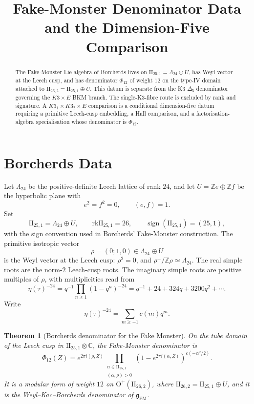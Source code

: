 \documentclass[11pt]{amsart}
\newtheorem{theorem}{Theorem}[section]
\theoremstyle{definition}
\theoremstyle{remark}
\providecommand{\C}{\mathbb{C}}
\providecommand{\Z}{\mathbb{Z}}
\providecommand{\Leech}{\Lambda_{24}}
\providecommand{\IIlor}{\mathrm{II}_{25,1}}
\providecommand{\IIpar}{\mathrm{II}_{26,2}}
\providecommand{\PhiFM}{\Phi_{12}}
\providecommand{\gFM}{\mathfrak{g}_{\mathrm{FM}}}
\providecommand{\rk}{\mathrm{rk}}
\begin{document}
\title{Fake-Monster Denominator Data and the Dimension-Five Comparison}
\author{}
\date{}
\maketitle

\begin{abstract}
The Fake-Monster Lie algebra of Borcherds lives on
\(\IIlor=\Leech\oplus U\), has Weyl vector at the Leech cusp, and has
denominator \(\PhiFM\) of weight \(12\) on the type-IV domain attached to
\(\IIpar=\IIlor\oplus U\). This datum is separate from the K3
\(\Delta_5\) denominator governing the \(K3\times E\) BKM branch. The
single-K3-fibre route is excluded by rank and signature. A
\(K3_1\times K3_2\times E\) comparison is a conditional dimension-five
datum requiring a primitive Leech-cusp embedding, a Hall comparison, and a
factorisation-algebra specialisation whose denominator is \(\PhiFM\).
\end{abstract}

\section{Borcherds Data}

Let \(\Leech\) be the positive-definite Leech lattice of rank \(24\), and
let \(U=\Z e\oplus \Z f\) be the hyperbolic plane with
\[
 e^2=f^2=0,\qquad (e,f)=1 .
\]
Set
\[
 \IIlor=\Leech\oplus U,\qquad \rk \IIlor=26,\qquad
 \operatorname{sign}(\IIlor)=(25,1),
\]
with the sign convention used in Borcherds' Fake-Monster construction.
The primitive isotropic vector
\[
 \rho=(0;1,0)\in \Leech\oplus U
\]
is the Weyl vector at the Leech cusp: \(\rho^2=0\), and
\(\rho^\perp/\Z\rho\simeq \Leech\). The real simple roots are the
norm-\(2\) Leech-cusp roots. The imaginary simple roots are positive
multiples of \(\rho\), with multiplicities read from
\[
 \eta(\tau)^{-24}
 =
 q^{-1}\prod_{n\geq1}(1-q^n)^{-24}
 =
 q^{-1}+24+324q+3200q^2+\cdots .
\]
Write
\[
 \eta(\tau)^{-24}=\sum_{m\geq -1} c(m)q^m .
\]

\begin{theorem}[Borcherds denominator for the Fake Monster]
\label{thm:fm-borcherds-denominator-data}
On the tube domain of the Leech cusp in
\(\IIlor\otimes\C\), the Fake-Monster denominator is
\[
 \PhiFM(Z)
 =
 e^{2\pi i(\rho,Z)}
 \prod_{\substack{\alpha\in\IIlor\\(\alpha,\rho)>0}}
 \left(1-e^{2\pi i(\alpha,Z)}\right)^{c(-\alpha^2/2)} .
\]
It is a modular form of weight \(12\) on
\(\mathrm{O}^+(\IIpar)\), where \(\IIpar=\IIlor\oplus U\), and it is the
Weyl--Kac--Borcherds denominator of \(\gFM\).
\end{theorem}
\end{document}
